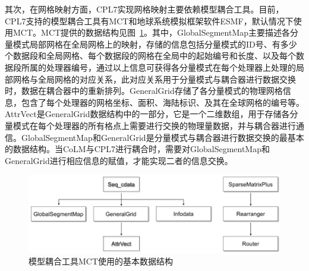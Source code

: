 其次，在网格映射方面，CPL7实现网格映射主要依赖模型耦合工具。目前，CPL7支持的模型耦合工具有MCT和地球系统模拟框架软件ESMF，默认情况下使用MCT。MCT提供的数据结构见图~\ref{fig:MCT的基本数据结构}。其中，GlobalSegmentMap主要描述各分量模式局部网格在全局网格上的映射，存储的信息包括分量模式的ID号、有多少个数据段和全局网格、每个数据段的网格在全局中的起始编号和长度、以及每个数据段所属的处理器编号，通过以上信息可获得各分量模式在每个处理器上处理的局部网格与全局网格的对应关系，此对应关系用于分量模式与耦合器进行数据交换时，数据在耦合器中的重新排列。GeneralGrid存储了各分量模式的物理网格信息，包含了每个处理器的网格坐标、面积、海陆标识、及其在全球网格的编号等。AttrVect是GeneralGrid数据结构中的一部分，它是一个二维数组，用于存储各分量模式在每个处理器的所有格点上需要进行交换的物理量数据，并与耦合器进行通信。GlobalSegmentMap和GeneralGrid是分量模式与耦合器进行数据交换的最基本的数据结构。当CoLM与CPL7进行耦合时，需要对GlobalSegmentMap和GeneralGrid进行相应信息的赋值，才能实现二者的信息交换。

{
\begin{figure}[htbp]
\centering
\includegraphics{Figures/模式构架/MCT的基本数据结构.png}
\caption{模型耦合工具MCT使用的基本数据结构}
\label{fig:MCT的基本数据结构}
\end{figure}
}

